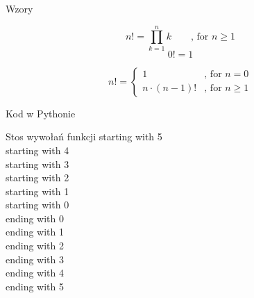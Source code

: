 \begin{frame}{Wzory}
    \begin{definition}
        \[ n! = \prod\limits_{k = 1}^{n}k \qquad \text{, for } n \geq 1 \]
        \[ 0! = 1 \]
    \end{definition}
    \begin{definition}[recursion]
        \[ n! =
        \begin{cases}
            1 & \text{, for } n = 0 \\
            n \cdot (n - 1)! & \text{, for } n \geq 1
        \end{cases}
        \]
    \end{definition}
\end{frame}
\begin{frame}[fragile]{Kod w Pythonie}
    
\end{frame}
\begin{frame}{Stos wywołań funkcji}
    \centering
    starting with 5\\
    starting with 4\\
    starting with 3\\
    starting with 2\\
    starting with 1\\
    starting with 0\\
    ending with 0\\
    ending with 1\\
    ending with 2\\
    ending with 3\\
    ending with 4\\
    ending with 5\\
\end{frame}